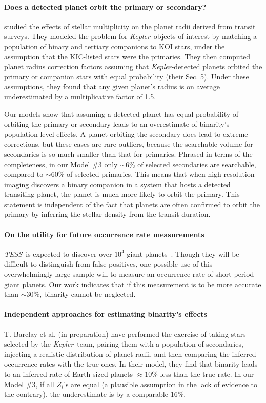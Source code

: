 \documentclass[12pt,modern]{aastex61}
\begin{document}
\paragraph{Does a detected planet orbit the primary or secondary?}
\citet{ciardi_understanding_2015} studied the effects of stellar multiplicity 
on the planet radii derived from transit surveys.
They modeled the problem for {\it Kepler}\ objects of interest by matching a 
population of binary and tertiary companions to KOI stars, 
under the assumption that the KIC-listed stars were the primaries.
They then computed planet radius correction factors assuming that {\it 
    Kepler}-detected planets orbited the primary or companion stars
with equal probability (their Sec. 5).
Under these assumptions, they found that any given planet's radius is on 
average underestimated by a multiplicative factor of 1.5.

Our models show that assuming a detected planet has equal probability of 
orbiting the primary or secondary leads to an overestimate of
binarity's population-level effects.
A planet orbiting the secondary does lead to extreme corrections, but these 
cases are rare outliers, because the searchable volume for secondaries is so 
much smaller than that for primaries.
Phrased in terms of the completeness, in our Model \#3 only $\sim 6\%$ of 
selected secondaries are searchable, compared to $\sim 60\%$ of selected 
primaries.
This means that when high-resolution imaging discovers a binary companion in 
a system that hosts a detected transiting planet, the planet is much
more likely to orbit the primary.
This statement is independent of the fact that planets are often confirmed to 
orbit the primary by inferring the stellar density from the transit duration.


\paragraph{On the utility for future occurrence rate measurements}
{\it TESS}\ is expected to discover over $10^4$ giant 
planets~\citep{sullivan_transiting_2015}.
Though they will be difficult to distinguish from false positives, one 
possible use of this overwhelmingly large sample will to measure an
occurrence rate of short-period giant planets.
Our work indicates that if this measurement is to be more accurate than $\sim 
30\%$, binarity cannot be neglected.


\paragraph{Independent approaches for estimating binarity's effects}
T. Barclay et al.\! (in preparation) have performed the exercise of taking 
stars selected by the {\it Kepler}\ team, pairing them with a population of 
secondaries, injecting a realistic distribution of planet radii, 
and then comparing the inferred occurrence rates with the true ones.
In their model, they find that binarity leads to an inferred rate of 
Earth-sized planets $\approx 10\%$ less than the true rate.
In our Model \#3, if all $Z_i$'s are equal (a plausible assumption in 
the lack of evidence to the contrary), the underestimate is by a comparable 
16\%.
\end{document}
